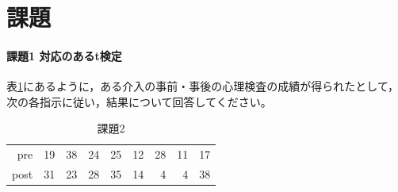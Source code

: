 \documentclass{ltjsbook}
\begin{document}
\section{課題}

\paragraph{課題1 対応のあるt検定}
表\ref{exe:20_2}にあるように，ある介入の事前・事後の心理検査の成績が得られたとして，次の各指示に従い，結果について回答してください。
\begin{table}[ht]
    \centering
    \caption{課題2}
    \label{exe:20_2}
    \begin{tabular}{rrrrrrrrr}
      \hline
    pre & 19 & 38 & 24 & 25 & 12 & 28 & 11 & 17 \\ 
      post & 31 & 23 & 28 & 35 & 14 & 4 & 4 & 38 \\ 
       \hline
    \end{tabular}
\end{table}
\end{document}
